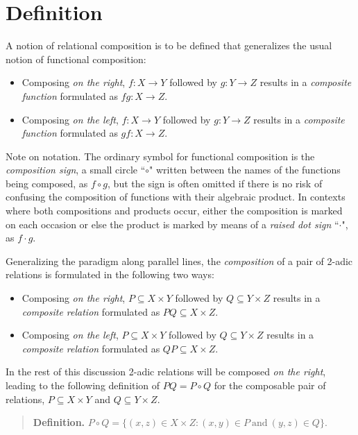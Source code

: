 \documentclass[12pt]{article}
\begin{document}
\section{Definition}

A notion of relational composition is to be defined that generalizes the usual notion of functional composition:

\begin{itemize}
\item
Composing \textit{on the right}, $f : X \to Y$ followed by $g : Y \to Z$ results in a \textit{composite function} formulated as $fg : X \to Z$.
\item
Composing \textit{on the left}, $f : X \to Y$ followed by $g :  Y \to Z$ results in a \textit{composite function} formulated as $gf : X \to Z$.
\end{itemize}

Note on notation.  The ordinary symbol for functional composition is the \textit{composition sign}, a small circle ``$\circ$" written between the names of the functions being composed, as $f \circ g$, but the sign is often omitted if there is no risk of confusing the composition of functions with their algebraic product.  In contexts where both compositions and products occur, either the composition is marked on each occasion or else the product is marked by means of a \textit{raised dot sign} ``$\cdot$", as $f \cdot g$.
 
Generalizing the paradigm along parallel lines, the \textit{composition} of a pair of 2-adic relations is formulated in the following two ways:

\begin{itemize}
\item
Composing \textit{on the right}, $P \subseteq X \times Y$ followed by $Q \subseteq Y \times Z$ results in a \textit{composite relation} formulated as $PQ \subseteq X \times Z$.
\item
Composing \textit{on the left}, $P \subseteq X \times Y$ followed by $Q \subseteq Y \times Z$ results in a \textit{composite relation} formulated as $QP \subseteq X \times Z$.
\end{itemize}

In the rest of this discussion 2-adic relations will be composed \textit{on the right}, leading to the following definition of $PQ = P \circ Q$ for the composable pair of relations, $P \subseteq X \times Y$ and $Q \subseteq Y \times Z$.

\begin{quote}
\textbf{Definition.}  $P \circ Q = \{ (x, z) \in X \times Z : (x, y) \in P\ \mathrm{and}\ (y, z) \in Q \}.$
\end{quote}
\end{document}
